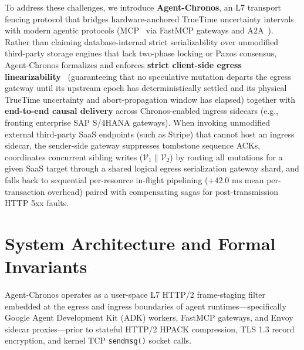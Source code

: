 \documentclass[conference,10pt]{IEEEtran}
\begin{document}
To address these challenges, we introduce \textbf{Agent-Chronos}, an L7 transport fencing protocol that bridges hardware-anchored TrueTime uncertainty intervals~\cite{corbett2013spanner} with modern agentic protocols (MCP~\cite{mcp2024spec} via FastMCP gateways and A2A~\cite{a2a2025spec}). Rather than claiming database-internal strict serializability over unmodified third-party storage engines that lack two-phase locking or Paxos consensus, Agent-Chronos formalizes and enforces \textbf{strict client-side egress linearizability}~\cite{herlihy1990linearizability} (guaranteeing that no speculative mutation departs the egress gateway until its upstream epoch has deterministically settled and its physical TrueTime uncertainty and abort-propagation window has elapsed) together with \textbf{end-to-end causal delivery} across Chronos-enabled ingress sidecars (e.g., fronting enterprise SAP S/4HANA gateways). When invoking unmodified external third-party SaaS endpoints (such as Stripe) that cannot host an ingress sidecar, the sender-side gateway suppresses tombstone sequence ACKs, coordinates concurrent sibling writes ($\mathcal{V}_1 \parallel \mathcal{V}_2$) by routing all mutations for a given SaaS target through a shared logical egress serialization gateway shard, and falls back to sequential per-resource in-flight pipelining ($+42.0\text{ ms}$ mean per-transaction overhead) paired with compensating sagas for post-transmission HTTP 5xx faults.

\section{System Architecture and Formal Invariants}
\label{sec:architecture}
Agent-Chronos operates as a user-space L7 HTTP/2 frame-staging filter embedded at the egress and ingress boundaries of agent runtimes---specifically Google Agent Development Kit (ADK) workers, FastMCP gateways, and Envoy sidecar proxies---prior to stateful HTTP/2 HPACK compression, TLS 1.3 record encryption, and kernel TCP \texttt{sendmsg()} socket calls.
\end{document}
